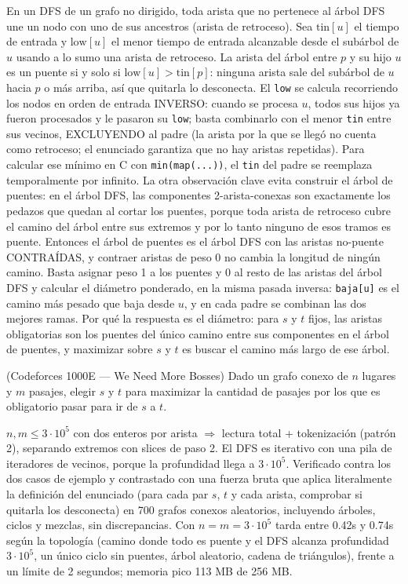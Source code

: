  En un DFS de un grafo no dirigido, toda arista que no pertenece al árbol DFS une un nodo con uno de sus ancestros (arista de retroceso). Sea $\text{tin}[u]$ el tiempo de entrada y $\text{low}[u]$ el menor tiempo de entrada alcanzable desde el subárbol de $u$ usando a lo sumo una arista de retroceso. La arista del árbol entre $p$ y su hijo $u$ es un puente si y solo si $\text{low}[u] > \text{tin}[p]$: ninguna arista sale del subárbol de $u$ hacia $p$ o más arriba, así que quitarla lo desconecta. El \texttt{low} se calcula recorriendo los nodos en orden de entrada INVERSO: cuando se procesa $u$, todos sus hijos ya fueron procesados y le pasaron su \texttt{low}; basta combinarlo con el menor \texttt{tin} entre sus vecinos, EXCLUYENDO al padre (la arista por la que se llegó no cuenta como retroceso; el enunciado garantiza que no hay aristas repetidas). Para calcular ese mínimo en C con \texttt{min(map(...))}, el \texttt{tin} del padre se reemplaza temporalmente por infinito. La otra observación clave evita construir el árbol de puentes: en el árbol DFS, las componentes 2-arista-conexas son exactamente los pedazos que quedan al cortar los puentes, porque toda arista de retroceso cubre el camino del árbol entre sus extremos y por lo tanto ninguno de esos tramos es puente. Entonces el árbol de puentes es el árbol DFS con las aristas no-puente CONTRAÍDAS, y contraer aristas de peso 0 no cambia la longitud de ningún camino. Basta asignar peso 1 a los puentes y 0 al resto de las aristas del árbol DFS y calcular el diámetro ponderado, en la misma pasada inversa: \texttt{baja[u]} es el camino más pesado que baja desde $u$, y en cada padre se combinan las dos mejores ramas. Por qué la respuesta es el diámetro: para $s$ y $t$ fijos, las aristas obligatorias son los puentes del único camino entre sus componentes en el árbol de puentes, y maximizar sobre $s$ y $t$ es buscar el camino más largo de ese árbol.~\cite{tarjan1972}


(Codeforces 1000E — We Need More Bosses) Dado un grafo conexo de $n$ lugares y $m$ pasajes, elegir $s$ y $t$ para maximizar la cantidad de pasajes por los que es obligatorio pasar para ir de $s$ a $t$.

 $n, m \le 3\cdot10^5$ con dos enteros por arista $\Rightarrow$ lectura total + tokenización (patrón 2), separando extremos con slices de paso 2. El DFS es iterativo con una pila de iteradores de vecinos, porque la profundidad llega a $3\cdot10^5$. Verificado contra los dos casos de ejemplo y contrastado con una fuerza bruta que aplica literalmente la definición del enunciado (para cada par $s$, $t$ y cada arista, comprobar si quitarla los desconecta) en 700 grafos conexos aleatorios, incluyendo árboles, ciclos y mezclas, sin discrepancias. Con $n = m = 3\cdot10^5$ tarda entre \aprox{}0.42s y \aprox{}0.74s según la topología (camino donde todo es puente y el DFS alcanza profundidad $3\cdot10^5$, un único ciclo sin puentes, árbol aleatorio, cadena de triángulos), frente a un límite de 2 segundos; memoria pico \aprox{}113 MB de 256 MB.

